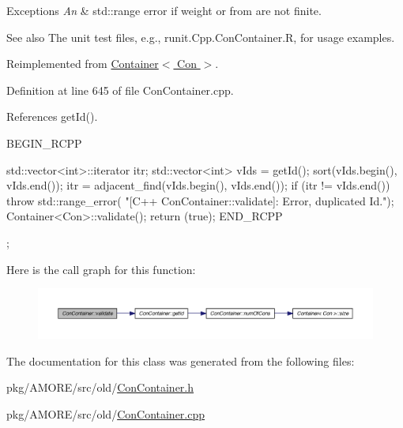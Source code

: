 \begin{DoxyExceptions}{Exceptions}
{\em An} & std::range error if weight or from are not finite.\\
\hline
\end{DoxyExceptions}
\begin{DoxySeeAlso}{See also}
The unit test files, e.g., runit.Cpp.ConContainer.R, for usage examples. 
\end{DoxySeeAlso}


Reimplemented from \hyperlink{class_container_aa99a036fd0fe6d6b82ba558157e557d3}{Container$<$ Con $>$}.



Definition at line 645 of file ConContainer.cpp.



References getId().


\begin{DoxyCode}
{
  BEGIN_RCPP

  std::vector<int>::iterator itr;
  std::vector<int> vIds = getId();
  sort(vIds.begin(), vIds.end());
  itr = adjacent_find(vIds.begin(), vIds.end());
  if (itr != vIds.end())
    throw std::range_error(
        "[C++ ConContainer::validate]: Error, duplicated Id.");
  Container<Con>::validate();
  return (true);
END_RCPP};
\end{DoxyCode}


Here is the call graph for this function:\nopagebreak
\begin{figure}[H]
\begin{center}
\leavevmode
\includegraphics[width=400pt]{class_con_container_aac12a3d3604db9ff715503816109470c_cgraph}
\end{center}
\end{figure}




The documentation for this class was generated from the following files:\begin{DoxyCompactItemize}
\item 
pkg/AMORE/src/old/\hyperlink{_con_container_8h}{ConContainer.h}\item 
pkg/AMORE/src/old/\hyperlink{_con_container_8cpp}{ConContainer.cpp}\end{DoxyCompactItemize}
